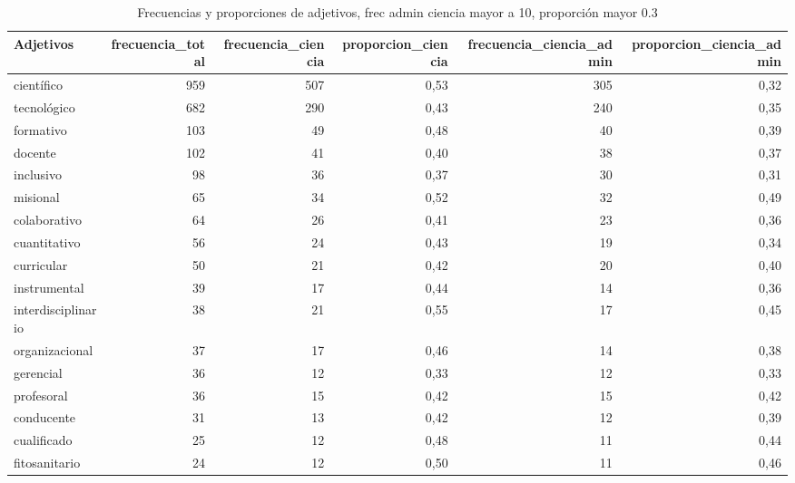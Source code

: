 \documentclass[11pt,                                                            
 superscriptaddress,twoside,
 amsmath,amssymb,
 aps, physrev
]{revtex4-2}
\begin{document}
\begin{table}[H]
	\centering
	\begin{tabular}{lrrrrr}
		\hline
		Adjetivos & frecuencia\_total & frecuencia\_ciencia & proporcion\_ciencia & frecuencia\_ciencia\_admin & proporcion\_ciencia\_admin \\
		\hline
		científico           & 959 & 507 & 0,53 & 305 & 0,32 \\
		tecnológico          & 682 & 290 & 0,43 & 240 & 0,35 \\
		formativo            & 103 & 49  & 0,48 & 40  & 0,39 \\
		docente              & 102 & 41  & 0,40 & 38  & 0,37 \\
		inclusivo            & 98  & 36  & 0,37 & 30  & 0,31 \\
		misional             & 65  & 34  & 0,52 & 32  & 0,49 \\
		colaborativo         & 64  & 26  & 0,41 & 23  & 0,36 \\
		cuantitativo         & 56  & 24  & 0,43 & 19  & 0,34 \\
		curricular           & 50  & 21  & 0,42 & 20  & 0,40 \\
		instrumental         & 39  & 17  & 0,44 & 14  & 0,36 \\
		interdisciplinario   & 38  & 21  & 0,55 & 17  & 0,45 \\
		organizacional       & 37  & 17  & 0,46 & 14  & 0,38 \\
		gerencial            & 36  & 12  & 0,33 & 12  & 0,33 \\
		profesoral           & 36  & 15  & 0,42 & 15  & 0,42 \\
		conducente           & 31  & 13  & 0,42 & 12  & 0,39 \\
		cualificado          & 25  & 12  & 0,48 & 11  & 0,44 \\
		fitosanitario        & 24  & 12  & 0,50 & 11  & 0,46 \\
		\hline
	\end{tabular}
	\caption{Frecuencias y proporciones de adjetivos, frec admin ciencia mayor a 10, proporción mayor 0.3}
\end{table}
\end{document}
